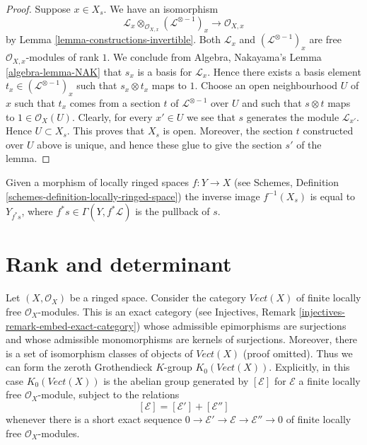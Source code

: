 \begin{proof}
Suppose $x \in X_s$.
We have an isomorphism
$$
\mathcal{L}_x \otimes_{\mathcal{O}_{X, x}} (\mathcal{L}^{\otimes -1})_x
\longrightarrow
\mathcal{O}_{X, x}
$$
by Lemma \ref{lemma-constructions-invertible}.
Both $\mathcal{L}_x$ and $(\mathcal{L}^{\otimes -1})_x$
are free $\mathcal{O}_{X, x}$-modules of rank $1$. We conclude
from Algebra, Nakayama's Lemma \ref{algebra-lemma-NAK} that
$s_x$ is a basis for $\mathcal{L}_x$. Hence there exists
a basis element $t_x \in (\mathcal{L}^{\otimes -1})_x$
such that $s_x \otimes t_x$ maps to $1$.
Choose an open neighbourhood $U$ of
$x$ such that $t_x$ comes from a section $t$
of $\mathcal{L}^{\otimes -1}$ over $U$ and such that
$s \otimes t$ maps to $1 \in \mathcal{O}_X(U)$.
Clearly, for every $x' \in U$ we see that $s$ generates
the module $\mathcal{L}_{x'}$. Hence $U \subset X_s$.
This proves that $X_s$ is open. Moreover, the section
$t$ constructed over $U$ above is unique, and hence
these glue to give the section $s'$ of the lemma.
\end{proof}

\begin{remark}
\label{remark-pullback-s-open}
Given a morphism of locally ringed spaces $f : Y \to X$
(see Schemes, Definition \ref{schemes-definition-locally-ringed-space})
the inverse image $f^{-1}(X_s)$ is equal to $Y_{f^*s}$, where
$f^*s \in \Gamma(Y, f^*\mathcal{L})$ is the pullback of $s$.
\end{remark}


\section{Rank and determinant}
\label{section-rank-and-det}

\noindent
Let $(X, \mathcal{O}_X)$ be a ringed space. Consider the category
$\textit{Vect}(X)$ of finite locally free $\mathcal{O}_X$-modules.
This is an exact category
(see Injectives, Remark \ref{injectives-remark-embed-exact-category})
whose admissible epimorphisms are
surjections and whose admissible monomorphisms are kernels of
surjections. Moreover, there is a set of isomorphism classes
of objects of $\textit{Vect}(X)$ (proof omitted). Thus we can form
the zeroth Grothendieck $K$-group $K_0(\textit{Vect}(X))$.
Explicitly, in this case $K_0(\textit{Vect}(X))$
is the abelian group generated by $[\mathcal{E}]$ for $\mathcal{E}$
a finite locally free $\mathcal{O}_X$-module, subject to the relations
$$
[\mathcal{E}] = [\mathcal{E}'] + [\mathcal{E}'']
$$
whenever there is a short exact sequence
$0 \to \mathcal{E}' \to \mathcal{E} \to \mathcal{E}'' \to 0$
of finite locally free $\mathcal{O}_X$-modules.


